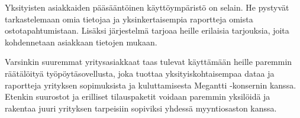        Yksityisten asiakkaiden pääsääntöinen käyttöympäristö on selain. He pystyvät tarkastelemaan omia tietojaa ja yksinkertaisempia raportteja omista 
        ostotapahtumistaan. Lisäksi järjestelmä tarjoaa heille erilaisia tarjouksia, joita kohdennetaan asiakkaan tietojen mukaan.

        Varsinkin suuremmat yritysasiakkaat taas tulevat käyttämään heille paremmin räätälöityä työpöytäsovellusta, joka tuottaa yksityiskohtaisempaa
        dataa ja raportteja yrityksen sopimuksista ja kuluttamisesta Megantti -konsernin kanssa. Etenkin suurostot ja erilliset tilauspaketit 
        voidaan paremmin yksilöidä ja rakentaa juuri yrityksen tarpeisiin sopiviksi yhdessä myyntiosaston kanssa.



